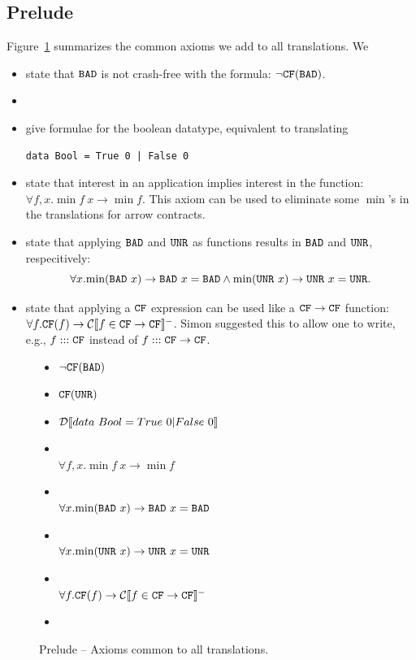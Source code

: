 \documentclass[preprint]{sigplanconf}
\begin{document}
\subsection{Prelude}
Figure~\ref{fig:prelude} summarizes the common axioms we add to all
translations.  We 
\begin{itemize}
  \item state that $\texttt{BAD}$ is not crash-free with the formula:
$\lnot \texttt{CF}(\texttt{BAD})$.

  \item {}

  \item give formulae for the boolean datatype, equivalent to
translating
\begin{verbatim}
data Bool = True 0 | False 0
\end{verbatim}

  \item \designChoice state that interest in an application implies
  interest in the function: $\forall f,x. \min{f ~x} \to \min{f}$.  This axiom can
  be used to eliminate some $\min{}$'s in the translations for arrow contracts.

  \item \designChoice state that applying $\texttt{BAD}$ and $\texttt{UNR}$ as functions
  results in $\texttt{BAD}$ and $\texttt{UNR}$, respecitively: \[
  \forall x. \mbox{min}(\texttt{BAD} ~x) \to \texttt{BAD} ~x = \texttt{BAD} \land \mbox{min}(\texttt{UNR} ~x) \to \texttt{UNR} ~x = \texttt{UNR}.
  \]

  \item \designChoice state that applying a $\texttt{CF}$ expression can be used like a
  $\texttt{CF} \to \texttt{CF}$ function: $\forall f. \texttt{CF}(f) \to \mathcal{C} \llbracket f \in \texttt{CF} \to \texttt{CF} \rrbracket^-$.
  Simon suggested this to allow one to write, e.g., $f ::: \texttt{CF}$ instead of 
  $f ::: \texttt{CF} \to \texttt{CF}$.
\end{itemize}

\begin{figure}\label{fig:prelude}
  \begin{itemize}
    \item $\lnot \texttt{CF}(\texttt{BAD})$
    \item $\texttt{CF}(\texttt{UNR})$
    \item $\mathcal{D} \llbracket data~Bool = True~0 | False~0 \rrbracket$
    \item \designChoice\\ $\forall f,x. \min{f ~x} \to \min{f}$
    \item \designChoice\\ $\forall x. \mbox{min}(\texttt{BAD} ~x) \to \texttt{BAD} ~x = \texttt{BAD}$ 
    \item \designChoice\\ $\forall x. \mbox{min}(\texttt{UNR} ~x) \to \texttt{UNR} ~x = \texttt{UNR}$
    \item \designChoice\\ $\forall f. \texttt{CF}(f) \to \mathcal{C} \llbracket f \in \texttt{CF} \to \texttt{CF} \rrbracket^-$
    \item 
  \end{itemize}
  \caption{Prelude -- Axioms common to all translations.}
\end{figure}
\end{document}
